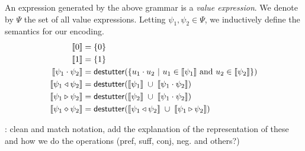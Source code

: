 An expression generated by the above grammar is a \emph{value expression}.
We denote by $\Psi$ the set of all value expressions.
Letting $\psi_1, \psi_2 \in \Psi$, we inductively define the semantics for our encoding.
\begin{align*}
		\llbracket 0 \rrbracket &=  \{ 0 \} \\
		\llbracket 1 \rrbracket &=  \{ 1 \} \\
		\llbracket \psi_1 \cdot \psi_2 \rrbracket &= \mathsf{destutter}(\{ u_1 \cdot u_2~|~u_1 \in \llbracket \psi_1 \rrbracket \text{ and } u_2 \in \llbracket \psi_2 \rrbracket \}) \\
		\llbracket \psi_1 \triangleleft \psi_2 \rrbracket &= \mathsf{destutter}(\llbracket \psi_1 \rrbracket \; \cup \;  \llbracket \psi_1 \cdot \psi_2 \rrbracket) \\
		\llbracket \psi_1 \triangleright \psi_2 \rrbracket &= \mathsf{destutter}(\llbracket \psi_2 \rrbracket \; \cup \;  \llbracket \psi_1 \cdot \psi_2 \rrbracket) \\
		\llbracket \psi_1 \diamond \psi_2 \rrbracket &= \mathsf{destutter}(\llbracket \psi_1 \triangleleft \psi_2 \rrbracket \; \cup \; \llbracket \psi_1 \triangleright \psi_2 \rrbracket)\\
\end{align*}

\TODO: clean and match notation, add the explanation of the representation of these and how we do the operations (pref, suff, conj, neg. and others?)




